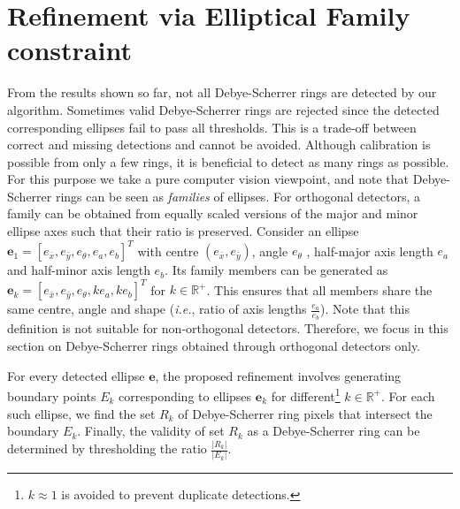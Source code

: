 \documentclass[preprint]{iucr}              %
\newcommand\dsr{Debye-Scherrer ring}
\newcommand\dsrs{Debye-Scherrer rings}
\begin{document}
\section{Refinement via Elliptical Family constraint}
\label{sec:family}
From the results shown so far, not all {\dsrs} are detected by our algorithm. 
Sometimes valid \dsrs{} are rejected since the detected corresponding ellipses
fail to pass all thresholds. 
This is a trade-off between correct and missing detections and cannot be avoided. 
Although calibration is possible from only a few rings, it is beneficial to
detect as many rings as possible. 
For this purpose we take a pure computer vision viewpoint, and note that {\dsrs}
can be seen as \emph{families} of ellipses. 
For orthogonal detectors, a family can be obtained from equally scaled versions
of the major and minor ellipse axes such that their ratio is preserved. 
Consider an ellipse
$\mathbf{e}_1=\left[e_{\bar{x}},e_{\bar{y}},e_{\theta},e_a,e_b\right]^T$ with
centre $(e_{\bar{x}},e_{\bar{y}})$, angle $e_\theta$ , half-major axis length
$e_a$ and half-minor axis length $e_b$.   
Its family members can be generated as
$\mathbf{e}_k=\left[e_{\bar{x}},e_{\bar{y}},e_{\theta},ke_a,ke_b\right]^T$ for
$k\in\mathbb{R}^+$.  
This ensures that all members share the same centre, angle and shape
(\emph{i.e.}, ratio of axis lengths $\frac{e_a}{e_b}$). 
Note that this definition is not suitable for non-orthogonal detectors. 
Therefore, we focus in this section on \dsrs{} obtained through orthogonal
detectors only. 

For every detected ellipse $\mathbf{e}$, the proposed refinement involves
generating boundary points $E_k$ corresponding to ellipses $\mathbf{e}_k$ for
different\footnote{$k\approx1$ is avoided to prevent duplicate detections.}
$k\in\mathbb{R}^+$.   
For each such ellipse, we find the set $R_k$ of \dsr{} pixels that intersect the
boundary $E_k$. 
Finally, the validity of set $R_k$ as a \dsr{} can be determined by thresholding
the ratio $\frac{|R_k|}{|E_k|}$. 
\end{document}
